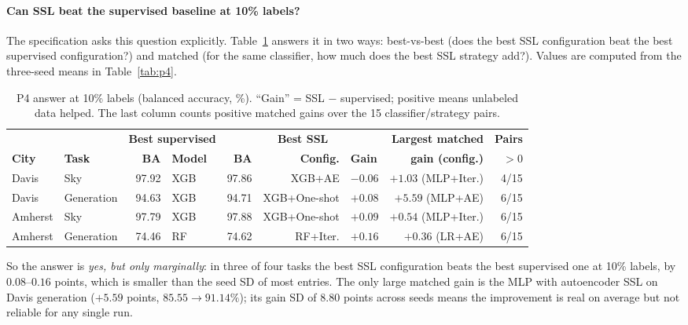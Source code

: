 \documentclass[11pt,letterpaper]{article}
\begin{document}


\paragraph{Can SSL beat the supervised baseline at 10\% labels?}
The specification asks this question explicitly. Table~\ref{tab:p4gain} answers it in two ways:
best-vs-best (does the best SSL configuration beat the best supervised configuration?) and matched
(for the same classifier, how much does the best SSL strategy add?). Values are computed from the
three-seed means in Table~\ref{tab:p4}.

\begin{table}[!htbp]\centering\footnotesize
\caption{P4 answer at 10\% labels (balanced accuracy, \%). ``Gain'' = SSL $-$ supervised; positive means unlabeled data helped. The last column counts positive matched gains over the 15 classifier/strategy pairs.}\label{tab:p4gain}
\setlength{\tabcolsep}{4pt}
\begin{tabular}{@{}llrlrr lr r@{}}\toprule
 & & \multicolumn{2}{c}{\textbf{Best supervised}} & \multicolumn{3}{c}{\textbf{Best SSL}} & \textbf{Largest matched} & \textbf{Pairs}\\
\cmidrule(lr){3-4}\cmidrule(lr){5-7}
\textbf{City} & \textbf{Task} & \textbf{BA} & \textbf{Model} & \textbf{BA} & \textbf{Config.} & \textbf{Gain} & \textbf{gain (config.)} & \textbf{$>0$}\\\midrule
Davis & Sky & 97.92 & XGB & 97.86 & XGB+AE & $-0.06$ & $+1.03$ (MLP+Iter.) & 4/15\\
Davis & Generation & 94.63 & XGB & 94.71 & XGB+One-shot & \textbf{$+0.08$} & $+5.59$ (MLP+AE) & 6/15\\
Amherst & Sky & 97.79 & XGB & 97.88 & XGB+One-shot & \textbf{$+0.09$} & $+0.54$ (MLP+Iter.) & 6/15\\
Amherst & Generation & 74.46 & RF & 74.62 & RF+Iter. & \textbf{$+0.16$} & $+0.36$ (LR+AE) & 6/15\\
\bottomrule\end{tabular}
\end{table}

So the answer is \emph{yes, but only marginally}: in three of four tasks the best SSL configuration
beats the best supervised one at 10\% labels, by $0.08$--$0.16$ points, which is smaller than the
seed SD of most entries. The only large matched gain is the MLP with autoencoder SSL on Davis
generation ($+5.59$ points, $85.55\to91.14\%$); its gain SD of $8.80$ points across seeds means the
improvement is real on average but not reliable for any single run.
\end{document}
